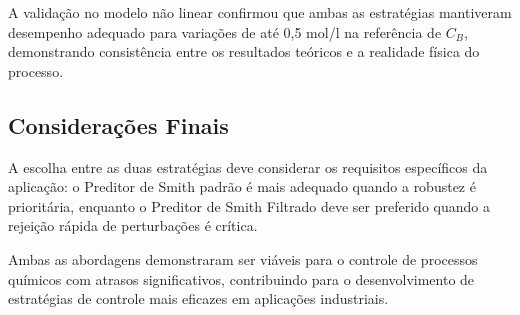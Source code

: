 \documentclass[a4paper,12pt]{article}
\begin{document}
A validação no modelo não linear confirmou que ambas as estratégias mantiveram desempenho adequado para variações de até 0,5 mol/l na referência de $C_B$, demonstrando consistência entre os resultados teóricos e a realidade física do processo.

\subsection{Considerações Finais}

A escolha entre as duas estratégias deve considerar os requisitos específicos da aplicação: o Preditor de Smith padrão é mais adequado quando a robustez é prioritária, enquanto o Preditor de Smith Filtrado deve ser preferido quando a rejeição rápida de perturbações é crítica.

Ambas as abordagens demonstraram ser viáveis para o controle de processos químicos com atrasos significativos, contribuindo para o desenvolvimento de estratégias de controle mais eficazes em aplicações industriais.
\end{document}
